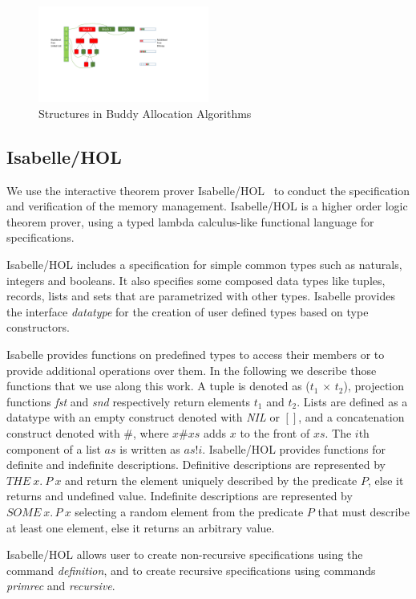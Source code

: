 \begin{figure}[htbp]
	\centering
	\includegraphics[width=0.5\textwidth]{fig3.pdf}
	\caption{Structures in Buddy Allocation Algorithms}
	\label{fig3}
\end{figure}

\subsection{Isabelle/HOL}
We use the interactive theorem prover Isabelle/HOL~\cite{reg_Isabelle/HOL} to conduct the specification and verification of the memory management. Isabelle/HOL is a higher order logic theorem prover, using a typed lambda calculus-like functional language for specifications. 

Isabelle/HOL includes a specification for simple common types such as naturals, integers and booleans. It also specifies some composed data types like tuples, records, lists and sets that are parametrized with other types. Isabelle provides the interface \emph{datatype} for the creation of user defined types based on type constructors. 

Isabelle provides functions on predefined types to access their members or to provide additional operations over them. In the following we describe those functions that we use along this work. A tuple is denoted as (\emph{$t_1$} $\times$ \emph{$t_2$}), projection functions \emph{fst} and \emph{snd} respectively return elements $t_1$ and $t_2$. Lists are defined as a datatype with an empty construct denoted with \emph{NIL} or $[]$, and a concatenation construct denoted with $\#$, where $x\#xs$ adds $x$ to the front of $xs$. The $i$th component of a list $as$ is written as $as!i$. Isabelle/HOL provides functions for definite and indefinite descriptions. Definitive descriptions are represented by $THE\ x.\ P\ x$ and return the element uniquely described by the predicate $P$, else it returns and undefined value. Indefinite descriptions are represented by $SOME\ x.\, P\ x$ selecting a random element from the predicate $P$ that must describe at least one element, else it returns an arbitrary value.

Isabelle/HOL allows user to create non-recursive specifications using the command \emph{definition}, and to create recursive specifications using commands \emph{primrec} and \emph{recursive}.
